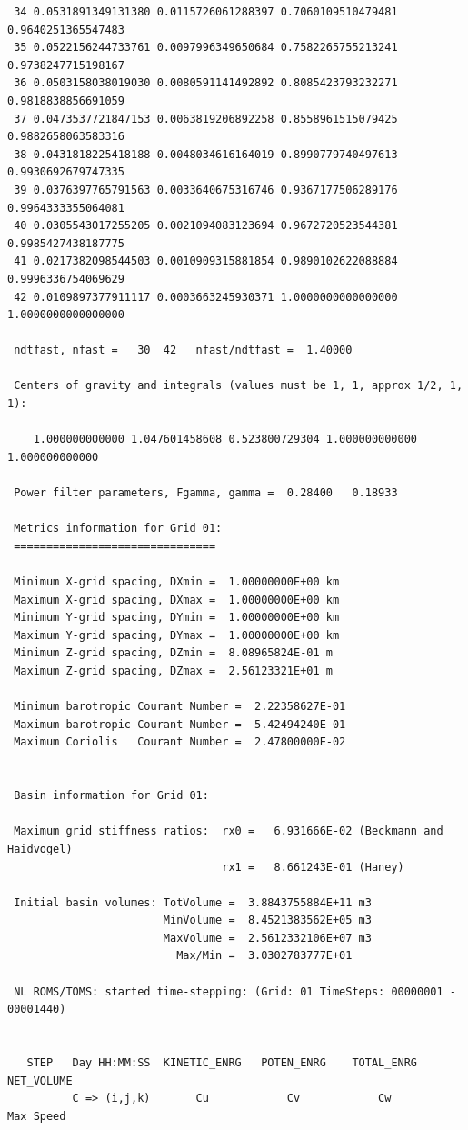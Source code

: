 \begin{verbatim}
 34 0.0531891349131380 0.0115726061288397 0.7060109510479481 0.9640251365547483
 35 0.0522156244733761 0.0097996349650684 0.7582265755213241 0.9738247715198167
 36 0.0503158038019030 0.0080591141492892 0.8085423793232271 0.9818838856691059
 37 0.0473537721847153 0.0063819206892258 0.8558961515079425 0.9882658063583316
 38 0.0431818225418188 0.0048034616164019 0.8990779740497613 0.9930692679747335
 39 0.0376397765791563 0.0033640675316746 0.9367177506289176 0.9964333355064081
 40 0.0305543017255205 0.0021094083123694 0.9672720523544381 0.9985427438187775
 41 0.0217382098544503 0.0010909315881854 0.9890102622088884 0.9996336754069629
 42 0.0109897377911117 0.0003663245930371 1.0000000000000000 1.0000000000000000

 ndtfast, nfast =   30  42   nfast/ndtfast =  1.40000

 Centers of gravity and integrals (values must be 1, 1, approx 1/2, 1, 1):

    1.000000000000 1.047601458608 0.523800729304 1.000000000000 1.000000000000

 Power filter parameters, Fgamma, gamma =  0.28400   0.18933

 Metrics information for Grid 01:
 ===============================

 Minimum X-grid spacing, DXmin =  1.00000000E+00 km
 Maximum X-grid spacing, DXmax =  1.00000000E+00 km
 Minimum Y-grid spacing, DYmin =  1.00000000E+00 km
 Maximum Y-grid spacing, DYmax =  1.00000000E+00 km
 Minimum Z-grid spacing, DZmin =  8.08965824E-01 m
 Maximum Z-grid spacing, DZmax =  2.56123321E+01 m

 Minimum barotropic Courant Number =  2.22358627E-01
 Maximum barotropic Courant Number =  5.42494240E-01
 Maximum Coriolis   Courant Number =  2.47800000E-02


 Basin information for Grid 01:

 Maximum grid stiffness ratios:  rx0 =   6.931666E-02 (Beckmann and Haidvogel)
                                 rx1 =   8.661243E-01 (Haney)

 Initial basin volumes: TotVolume =  3.8843755884E+11 m3
                        MinVolume =  8.4521383562E+05 m3
                        MaxVolume =  2.5612332106E+07 m3
                          Max/Min =  3.0302783777E+01

 NL ROMS/TOMS: started time-stepping: (Grid: 01 TimeSteps: 00000001 - 00001440)


   STEP   Day HH:MM:SS  KINETIC_ENRG   POTEN_ENRG    TOTAL_ENRG    NET_VOLUME
          C => (i,j,k)       Cu            Cv            Cw         Max Speed


\end{verbatim}
